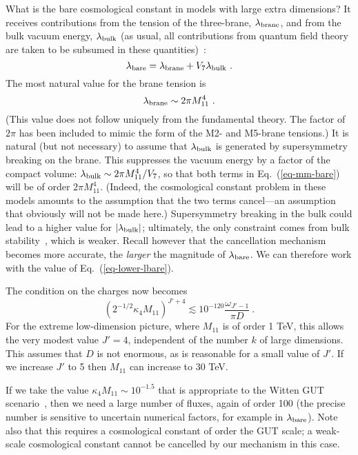 \documentclass[12pt]{article}
\begin{document}
What is the bare cosmological constant in models with large extra
dimensions?  It receives contributions from the tension of the
three-brane, $\lambda_{\rm brane}$, and from the bulk vacuum energy,
$\lambda_{\rm bulk}$ (as usual, all contributions from quantum field
theory are taken to be subsumed in these quantities)~\cite{Sun98,ArkDim98b}:
\begin{equation}
\lambda_{\rm bare} =
\lambda_{\rm brane} + V_7 \lambda_{\rm bulk}\ .
\label{eq-mm-bare}
\end{equation}
The most natural value for the brane tension is
\begin{equation}
\lambda_{\rm brane}
\sim 2 \pi M_{11}^4\ .
\label{eq-lower-lbare}
\end{equation}
(This value does not follow uniquely from the fundamental theory.  The
factor of $2\pi$ has been included to mimic the form of the M2- and
M5-brane tensions.)
It is natural (but not necessary) to assume that $\lambda_{\rm bulk}$
is generated by supersymmetry breaking on the brane.  This suppresses
the vacuum energy by a factor of the compact volume: $\lambda_{\rm
bulk} \sim 2 \pi M_{11}^4 / V_7$, so that both terms in
Eq.~(\ref{eq-mm-bare}) will be of order $2 \pi M_{11}^4$.  (Indeed,
the cosmological constant problem in these models amounts to the
assumption that the two terms cancel---an assumption that obviously
will not be made here.)  Supersymmetry breaking in the bulk could lead
to a higher value for $|\lambda_{\rm bulk}|$; ultimately, the only
constraint comes from bulk stability~\cite{ArkDim98b}, which is
weaker.  Recall however that the cancellation mechanism becomes more
accurate, the {\em larger} the magnitude of $\lambda_{\rm bare}$.  We
can therefore work with the value of Eq.~(\ref{eq-lower-lbare}).

The condition on the charges now becomes
\begin{equation}
(2^{-1/2} \kappa_4 M_{11})^{J'+4} \lesssim
10^{-120}\frac{\omega_{J'-1}}{\pi D} \ .
\end{equation}
For the extreme low-dimension picture, where $M_{11}$ is of order 1
TeV, this allows the very modest value $J' = 4$, independent of the
number $k$ of large dimensions.  This assumes that $D$ is not
enormous, as is reasonable for a small value of $J'$.  If we increase
$J'$ to 5 then $M_{11}$ can increase to 30 TeV.

If we take the value $\kappa_4 M_{11} \sim 10^{-1.5}$ that is
appropriate to the Witten GUT scenario~\cite{Wit96}, then we need a
large number of fluxes, again of order 100 (the precise number is
sensitive to uncertain numerical factors, for example in $\lambda_{\rm
bare}$).  Note also that this requires a cosmological constant of
order the GUT scale; a weak-scale cosmological constant cannot be
cancelled by our mechanism in this case.
\end{document}
